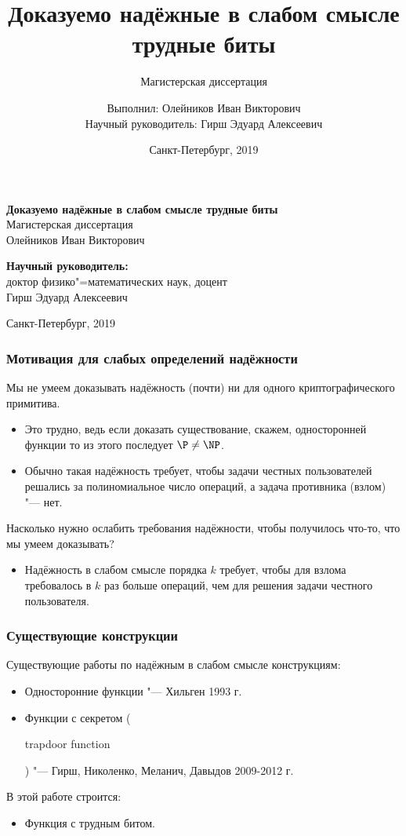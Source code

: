 \documentclass[mathserif,serif]{beamer} %
\title{Доказуемо надёжные в слабом смысле трудные биты}
\subtitle{Магистерская диссертация}
\author{Выполнил: Олейников Иван Викторович \\ Научный руководитель: Гирш Эдуард Алексеевич}
\date{Санкт-Петербург, 2019}
\theoremstyle{definition}
\theoremstyle{remark}
\begin{document}
\begin{frame}
\vspace{2cm}
\begin{center}
  \textbf{Доказуемо надёжные в слабом смысле трудные биты}
  \\
  Магистерская диссертация
  \\[1em]
  {
    Олейников Иван Викторович
  }
  \\[2em]
\end{center}

\hfill
\begin{minipage}{0.45\textwidth}
\textbf{Научный руководитель:} \\
доктор физико"=математических наук, доцент \\
Гирш Эдуард Алексеевич
\end{minipage}

\begin{center}
\mbox{}
\vfill
\small Санкт-Петербург, 2019
\end{center}
\end{frame}

\begin{frame}
  \frametitle{Мотивация для слабых определений надёжности}
  Мы не умеем доказывать надёжность (почти) ни для одного криптографического
  примитива.
  \begin{itemize}
  \item Это трудно, ведь если доказать существование, скажем, односторонней
  функции то из этого последует $\P \neq \NP$.
  \item Обычно такая надёжность требует, чтобы задачи честных пользователей
  решались за полиномиальное число операций, а задача противника (взлом) "---
  нет.
  \end{itemize}
  \pause
  Насколько нужно ослабить требования надёжности, чтобы получилось что-то, что
  мы умеем доказывать?
  \begin{itemize}
  \item Надёжность в слабом смысле порядка $k$ требует, чтобы для взлома
  требовалось в $k$ раз больше операций, чем для решения задачи честного
  пользователя.
  \end{itemize}
\end{frame}

\begin{frame}
  \frametitle{Существующие конструкции}
  Существующие работы по надёжным в слабом смысле конструкциям:
  \begin{itemize}
  \item Односторонние функции "--- Хильген 1993 г.
  \item Функции с секретом (\begin{english}trapdoor function\end{english}) "---
  Гирш, Николенко, Меланич, Давыдов 2009-2012 г.
  \end{itemize}
  \pause
  В этой работе строится:
  \begin{itemize}
  \item Функция с трудным битом.
  \end{itemize}
\end{frame}
\end{document}
